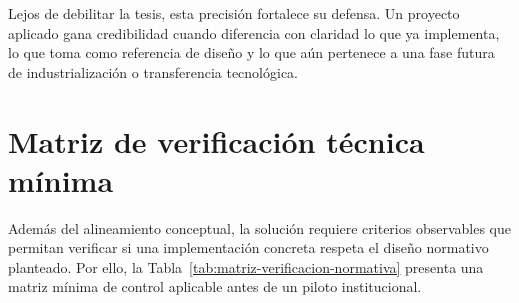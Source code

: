 Lejos de debilitar la tesis, esta precisión fortalece su defensa. Un proyecto aplicado gana credibilidad cuando diferencia con claridad lo que ya implementa, lo que toma como referencia de diseño y lo que aún pertenece a una fase futura de industrialización o transferencia tecnológica.

\section{Matriz de verificación técnica mínima}

Además del alineamiento conceptual, la solución requiere criterios observables que permitan verificar si una implementación concreta respeta el diseño normativo planteado. Por ello, la Tabla~\ref{tab:matriz-verificacion-normativa} presenta una matriz mínima de control aplicable antes de un piloto institucional.

